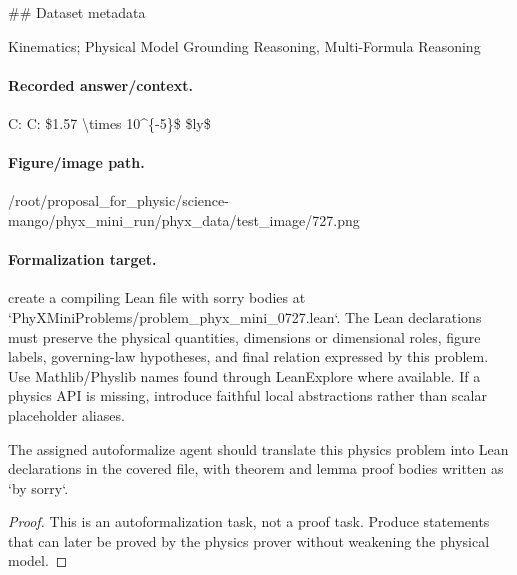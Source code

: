 \#\# Dataset metadata

Kinematics; Physical Model Grounding Reasoning, Multi-Formula Reasoning

\paragraph{Recorded answer/context.}
C: C: \$1.57 \textbackslash{}times 10\textasciicircum{}\{-5\}\$ \$ly\$

\paragraph{Figure/image path.}
/root/proposal\_for\_physic/science-mango/phyx\_mini\_run/phyx\_data/test\_image/727.png

\paragraph{Formalization target.}
create a compiling Lean file with sorry bodies at `PhyXMiniProblems/problem\_phyx\_mini\_0727.lean`. The Lean declarations must preserve the physical quantities, dimensions or dimensional roles, figure labels, governing-law hypotheses, and final relation expressed by this problem.
Use Mathlib/Physlib names found through LeanExplore where available. If a physics API is missing, introduce faithful local abstractions rather than scalar placeholder aliases.

\begin{theorem}
\label{thm:physics:phyx_mini_0727:target}
The assigned autoformalize agent should translate this physics problem into Lean declarations in the covered file, with theorem and lemma proof bodies written as `by sorry`.
\end{theorem}
\begin{proof}
This is an autoformalization task, not a proof task. Produce statements that can later be proved by the physics prover without weakening the physical model.
\end{proof}

